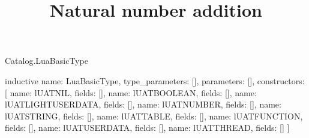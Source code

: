 \begin{lexlean}{Catalog.LuaBasicType}
\title{Natural number addition}
\begin{semanticmodule}
inductive{
  name: LuaBasicType,
  type_parameters: [],
  parameters: [],
  constructors: [
    {name: lUATNIL, fields: []},
    {name: lUATBOOLEAN, fields: []},
    {name: lUATLIGHTUSERDATA, fields: []},
    {name: lUATNUMBER, fields: []},
    {name: lUATSTRING, fields: []},
    {name: lUATTABLE, fields: []},
    {name: lUATFUNCTION, fields: []},
    {name: lUATUSERDATA, fields: []},
    {name: lUATTHREAD, fields: []}
  ]
}
\end{semanticmodule}
\end{lexlean}

